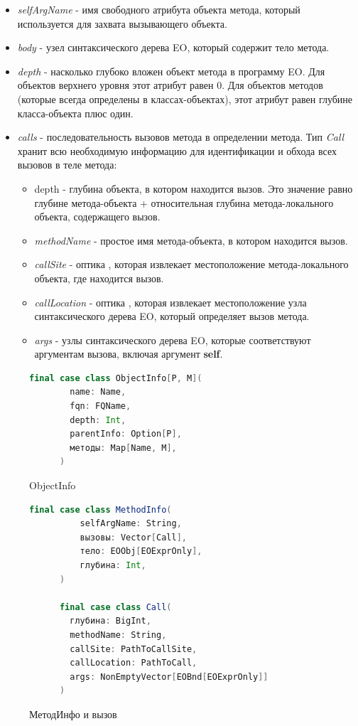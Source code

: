 \begin{itemize}
    \item \textit{selfArgName} - имя свободного атрибута объекта метода, который используется для захвата вызывающего объекта. 
    \item \textit{body} - узел синтаксического дерева EO, который содержит тело метода. 
    \item \textit{depth} - насколько глубоко вложен объект метода в программу EO. Для объектов верхнего уровня этот атрибут равен $0$. Для объектов методов (которые всегда определены в классах-объектах), этот атрибут равен глубине класса-объекта плюс один.  
    \item \textit{calls} - последовательность вызовов метода в определении метода. Тип \textit{Call} хранит всю необходимую информацию для идентификации и обхода всех вызовов в теле метода:
    \begin{itemize}
        \item depth - глубина объекта, в котором находится вызов. Это значение равно глубине метода-объекта + относительная глубина метода-локального объекта, содержащего вызов.
        \item \textit{methodName} - простое имя метода-объекта, в котором находится вызов.
        \item \textit{callSite} - оптика \cite{optics}, которая извлекает местоположение метода-локального объекта, где находится вызов. 
        \item \textit{callLocation} - оптика \cite{optics}, которая извлекает местоположение узла синтаксического дерева EO, который определяет вызов метода. 
        \item \textit{args} - узлы синтаксического дерева EO, которые соответствуют аргументам вызова, включая аргумент \textbf{self}.  
    \end{itemize}  
\end{itemize}

\begin{figure}
    \begin{lstlisting}[language=Scala]
      final case class ObjectInfo[P, M](
        name: Name,
        fqn: FQName,
        depth: Int,
        parentInfo: Option[P],
        методы: Map[Name, M],
      )
    \end{lstlisting}
    \caption{ObjectInfo}
    \label{fig:objinfo}
\end{figure}

\begin{figure}
    \begin{lstlisting}[language=Scala]
      final case class MethodInfo(
          selfArgName: String,
          вызовы: Vector[Call],
          тело: EOObj[EOExprOnly],
          глубина: Int,
      )
          
      final case class Call(
        глубина: BigInt,
        methodName: String,
        callSite: PathToCallSite,
        callLocation: PathToCall,
        args: NonEmptyVector[EOBnd[EOExprOnly]]
      )
    \end{lstlisting}
    \caption{МетодИнфо и вызов}
    \label{fig:methodinfo}
\end{figure}

